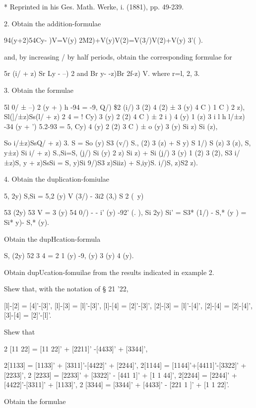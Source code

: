  * Reprinted in his Ges. Math. Werke, i. (1881), pp. 49-239.

%
%

2. Obtain the addition-formulae

94(y+2)54Cy- )V=V(y) 2M2)+V(y)V(2)=V(3/)V(2)+V(y) 3'( ).

and, by increasing / by half periods, obtain the corresponding
formulae for

5r (i/ + z) Sr Ly - --) 2 and Br y- -z)Br 2f-z) V. where r=l, 2, 3.

3. Obtain the formulae

5l 0/ ± --) 2 (y + ) h -94 = -9, Q/) \$2 (i/) 3 (2) 4 (2) ± 3 (y) 4 C
) 1 C ) 2 z), Sl(]/±z)Ss(l/ + z) 2 4 =  ! Cy) 3 (y) 2 (2) 4 C ) ± 2 i
) 4 (y) 1 (z) 3 i l h l/±z) -34 (y + ') 5.2-93 = 5, Cy) 4 (y) 2 (2) 3
C ) ± o (y) 3 (y) Si z) Si (z),

So i/±z)SsQ/ + z) 3. S = So (y) S3 (v/) S., (2) 3 (z) + S y) S 1/) S
(z) 3 (z), S, y±z) Si i/ + z) S.,Si=S, (j/) Si (y) 2 z) Si z) + Si
(j/) 3 (y) 1 (2) 3 (2), S3 i/±z)S, y + z)SsSi = S, y)Si 9/)S3 z)Siiz)
+ S,iy)S. i/)S, z)S2 z).


4. Obtain the duplication-fomiulae

5, 2y) S,Si = 5,2 (y) V (3/) - 3i2 (3,) S 2 (\ y)

53 (2y) 53 V = 3 (y) 54 0/) - - i' (y) -92' (. ), Si 2y) Si' = S3*
(1/) - S,* (y ) = Si* y)- S,* (y).

Obtain the dupHcation-formula

S, (2y) 52 3 4 = 2 1 (y) -9, (y) 3 (y) 4 (y).

Obtain dupUcation-fomuilae from the results indicated in example 2.

Shew that, with the notation of § 21 '22,

[l]-[2] = [4]'-[3]', [l]-[3] = [l]'-[3]', [l]-[4] = [2]'-[3]', [2]-[3]
= [l]'-[4]', [2]-[4] = [2]-[4]', [3]-[4] = [2]'-[l]'.

Shew that

2 [11 22] = [11 22]' + [2211]' -[4433]' + [3344]',

2[1133] = [1133]' + [3311]'-[4422]' + [2244]', 2[1144] =
[1144]'+[4411]'-[3322]' + [2233]', 2 [2233] = [2233]' + [3322]' - [441
1]' + [1 1 44]', 2[2244] = [2244]' + [4422]'-[3311]' + [1133]', 2
[3344] = [3344]' + [4433]' - [221 1 ]' + [1 1 22]'.

Obtain the formulae

